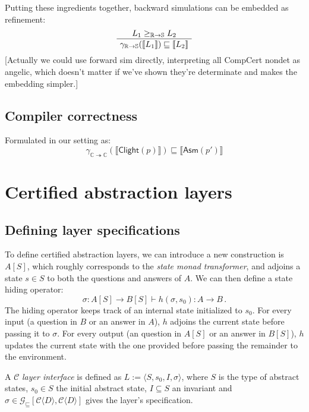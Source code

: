 \documentclass[format=sigplan,authordraft]{acmart}
\newcommand{\gcat}{\mathcal{G}_{\sqsubseteq}}
\newcommand{\kw}[1]{\ensuremath{\mathsf{#1}}}
\begin{document}
Putting these ingredients together,
backward simulations can be embedded as refinement:
\[
    \AxiomC{$L_1 \ge_{\mathbb{R} \rightarrow \mathbb{S}} L_2$}
    \UnaryInfC{$\gamma_{\mathbb{R} \rightarrow \mathbb{S}}
                (\llbracket L_1 \rrbracket) \sqsubseteq
                \llbracket L_2 \rrbracket$}
    \DisplayProof
\]
[Actually we could use forward sim directly,
interpreting all CompCert nondet as angelic,
which doesn't matter if we've shown they're determinate
and makes the embedding simpler.]


\subsection{Compiler correctness} %

Formulated in our setting as:
\[
    \gamma_{\mathbb{C} \twoheadrightarrow \mathbb{C}}
          (\llbracket \kw{Clight}(p) \rrbracket) \sqsubseteq
    \llbracket \kw{Asm}(p') \rrbracket
\]



\section{Certified abstraction layers} %

\subsection{Defining layer specifications} %

To define certified abstraction layers,
we can introduce a new construction is $A[S]$,
which roughly corresponds to the \emph{state monad transformer},
and adjoins a state $s \in S$ to both the questions and answers of $A$.
We can then define a state hiding operator:
\[
    \sigma : A[S] \rightarrow B[S] \vdash
    h(\sigma, s_0) : A \rightarrow B \,.
\]
The hiding operator keeps track of an internal state
initialized to $s_0$.
For every input (a question in $B$ or an answer in $A$),
$h$ adjoins the current state before passing it to $\sigma$.
For every output (an question in $A[S]$ or an answer in $B[S]$),
$h$ updates the current state with the one provided
before passing the remainder to the environment.

A $\mathcal{C}$ \emph{layer interface} is defined as
$L := \langle S, s_0, I, \sigma \rangle$,
where $S$ is the type of abstract states,
$s_0 \in S$ the initial abstract state,
$I \subseteq S$ an invariant and
$\sigma \in
 \gcat[\mathcal{C}\langle D \rangle, \mathcal{C}\langle D \rangle]$
gives the layer's specification.
\end{document}
